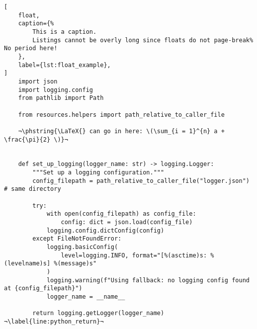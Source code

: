 \begin{lstlisting}[
    float,
    caption={%
        This is a caption.
        Listings cannot be overly long since floats do not page-break% No period here!
    },
    label={lst:float_example},
]
    import json
    import logging.config
    from pathlib import Path

    from resources.helpers import path_relative_to_caller_file

    ¬\phstring{\LaTeX{} can go in here: \(\sum_{i = 1}^{n} a + \frac{\pi}{2} \)}¬


    def set_up_logging(logger_name: str) -> logging.Logger:
        """Set up a logging configuration."""
        config_filepath = path_relative_to_caller_file("logger.json")  # same directory

        try:
            with open(config_filepath) as config_file:
                config: dict = json.load(config_file)
            logging.config.dictConfig(config)
        except FileNotFoundError:
            logging.basicConfig(
                level=logging.INFO, format="[%(asctime)s: %(levelname)s] %(message)s"
            )
            logging.warning(f"Using fallback: no logging config found at {config_filepath}")
            logger_name = __name__

        return logging.getLogger(logger_name) ¬\label{line:python_return}¬
\end{lstlisting}

